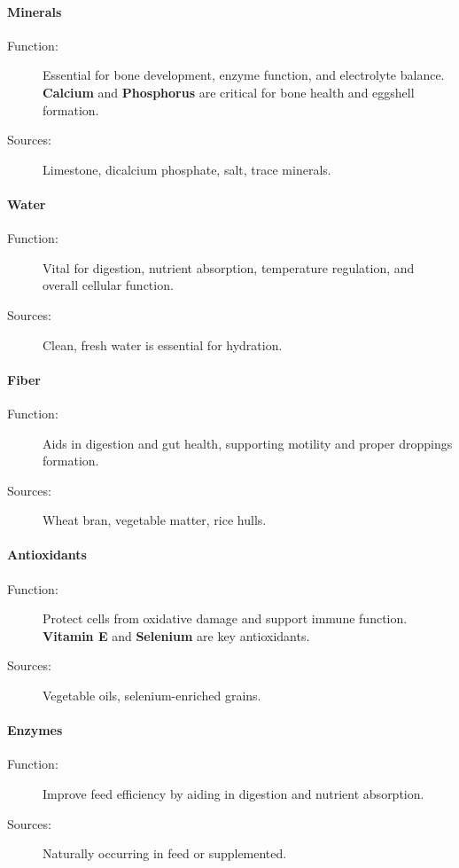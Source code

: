 \documentclass[a4paper,12pt]{article}
\begin{document}
\paragraph{Minerals}
\begin{description}
	\item[Function:] Essential for bone development, enzyme function, and
electrolyte balance. \textbf{Calcium} and \textbf{Phosphorus} are critical for bone health
and eggshell formation.
	\item[Sources:] Limestone, dicalcium phosphate, salt, trace minerals.
\end{description}

\paragraph{Water}
\begin{description}
	\item[Function:] Vital for digestion, nutrient absorption, temperature regulation,
and overall cellular function.
	\item[Sources:] Clean, fresh water is essential for hydration.
\end{description}

\paragraph{Fiber}
\begin{description}
	\item[Function:] Aids in digestion and gut health, supporting motility and proper
droppings formation.
	\item[Sources:] Wheat bran, vegetable matter, rice hulls.
\end{description}

\paragraph{Antioxidants}
\begin{description}
	\item[Function:] Protect cells from oxidative damage and support immune
function. \textbf{Vitamin E} and \textbf{Selenium} are key antioxidants.
	\item[Sources:] Vegetable oils, selenium-enriched grains.
\end{description}

\paragraph{Enzymes}
\begin{description}
	\item[Function:] Improve feed efficiency by aiding in digestion and nutrient
absorption.
	\item[Sources:] Naturally occurring in feed or supplemented.
\end{description}
\end{document}
